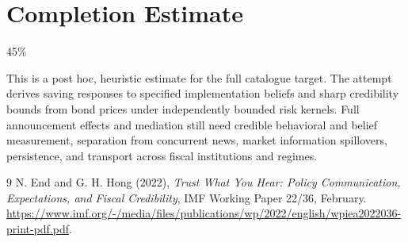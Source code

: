 \documentclass[11pt]{article}
\theoremstyle{definition}
\begin{document}
\section{Completion Estimate}
45\%

This is a post hoc, heuristic estimate for the full catalogue target.
The attempt derives saving responses to specified implementation beliefs and sharp credibility bounds from bond prices under independently bounded risk kernels. Full announcement effects and mediation still need credible behavioral and belief measurement, separation from concurrent news, market information spillovers, persistence, and transport across fiscal institutions and regimes.

\begin{thebibliography}{9}
 N. End and G. H. Hong (2022), \emph{Trust What You Hear: Policy Communication, Expectations, and Fiscal Credibility}, IMF Working Paper 22/36, February. \url{https://www.imf.org/-/media/files/publications/wp/2022/english/wpiea2022036-print-pdf.pdf}.
\end{thebibliography}
\end{document}
